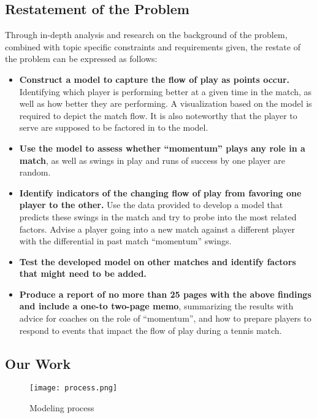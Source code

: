 \documentclass{mcmthesis}
\begin{document}
\subsection{Restatement of the Problem}%
Through in-depth analysis and research on the background of the problem, combined with
topic specific constraints and requirements given, the restate of the problem can be expressed as
follows: 
\begin{itemize}
    \item {\bf Construct a model to capture the flow of play as points occur.} Identifying which player
    is performing better at a given time in the match, as well as how better they are performing. A
    visualization based on the model is required to depict the match flow. It is also noteworthy
    that the player to serve are supposed to be factored in to the model. 
    \item {\bf Use the model to assess whether “momentum” plays any role in a match}, as well as
    swings in play and runs of success by one player are random. 
    \item {\bf Identify indicators of the changing flow of play from favoring one player to the other.} Use the data provided to develop a model that predicts these swings in the match and try to
    probe into the most related factors. Advise a player going into a new match against a
    different player with the differential in past match “momentum” swings.
    \item {\bf Test the developed model on other matches and identify factors that might need to be
    added.}
    \item {\bf Produce a report of no more than 25 pages with the above findings and include a one-to two-page memo}, summarizing the results with advice for coaches on the role of “momentum”, and how to prepare players to respond to events that impact the flow of play
    during a tennis match.
\end{itemize}

\subsection{Our Work}%

\begin{figure}[htbp]
    \centering
    \texttt{[image: process.png]}
    \caption{Modeling process} 
\end{figure}
\end{document}
